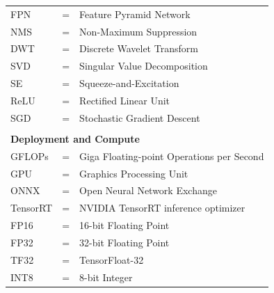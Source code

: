 \begin{tabular}{llp{3in}}
	FPN       & \hspace{1.5cm} = & Feature Pyramid Network \\
	NMS       & \hspace{1.5cm} = & Non-Maximum Suppression \\
	DWT       & \hspace{1.5cm} = & Discrete Wavelet Transform \\
	SVD       & \hspace{1.5cm} = & Singular Value Decomposition \\
	SE        & \hspace{1.5cm} = & Squeeze-and-Excitation \\
	ReLU      & \hspace{1.5cm} = & Rectified Linear Unit \\
	SGD       & \hspace{1.5cm} = & Stochastic Gradient Descent \\
	\\
	\multicolumn{3}{l}{\textbf{Deployment and Compute}} \\
	GFLOPs    & \hspace{1.5cm} = & Giga Floating-point Operations per Second \\
	GPU       & \hspace{1.5cm} = & Graphics Processing Unit \\
	ONNX      & \hspace{1.5cm} = & Open Neural Network Exchange \\
	TensorRT  & \hspace{1.5cm} = & NVIDIA TensorRT inference optimizer \\
	FP16      & \hspace{1.5cm} = & 16-bit Floating Point \\
	FP32      & \hspace{1.5cm} = & 32-bit Floating Point \\
	TF32      & \hspace{1.5cm} = & TensorFloat-32 \\
	INT8      & \hspace{1.5cm} = & 8-bit Integer \\
\end{tabular}
